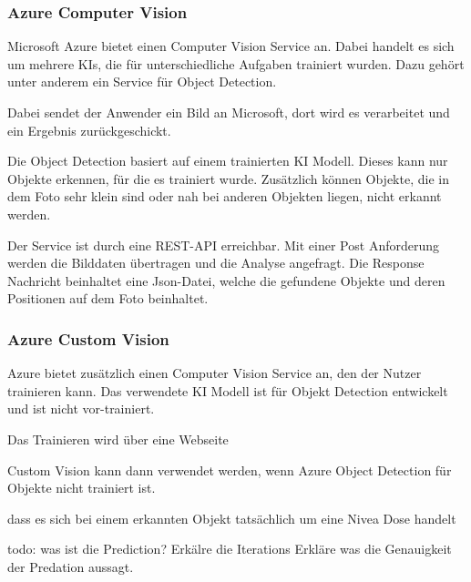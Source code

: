 
\subsubsection{Azure Computer Vision}
Microsoft Azure bietet einen Computer Vision Service an. Dabei handelt es sich um mehrere KIs, die für unterschiedliche Aufgaben trainiert wurden. Dazu gehört unter anderem ein Service für Object Detection.

Dabei sendet der Anwender ein Bild an Microsoft, dort wird es verarbeitet und ein Ergebnis zurückgeschickt.\citep{getAzure,whatIsAzure,objDetectAzure,Azure302Doc}

Die Object Detection basiert auf einem trainierten KI Modell. Dieses kann nur Objekte erkennen, für die es trainiert wurde.
Zusätzlich können Objekte, die in dem Foto sehr klein sind oder nah bei anderen Objekten liegen, nicht erkannt werden.\citep{azureobjdetec}

Der Service ist durch eine REST-API erreichbar. Mit einer Post Anforderung werden die Bilddaten übertragen und die Analyse angefragt. Die Response Nachricht beinhaltet eine Json-Datei, welche die gefundene Objekte und deren Positionen auf dem Foto beinhaltet. 


\subsubsection{Azure Custom Vision}
Azure bietet zusätzlich einen Computer Vision Service an, den der Nutzer trainieren kann. 
Das verwendete KI Modell ist für Objekt Detection entwickelt und ist nicht vor-trainiert.

Das Trainieren wird über eine Webseite 

Custom Vision kann dann verwendet werden, wenn Azure Object Detection für Objekte nicht trainiert ist.\citep{Azure302bDoc}


dass es sich bei einem erkannten Objekt tatsächlich um eine Nivea Dose handelt


todo: was ist die Prediction? 
Erkälre die Iterations
Erkläre was die Genauigkeit der Predation aussagt.



